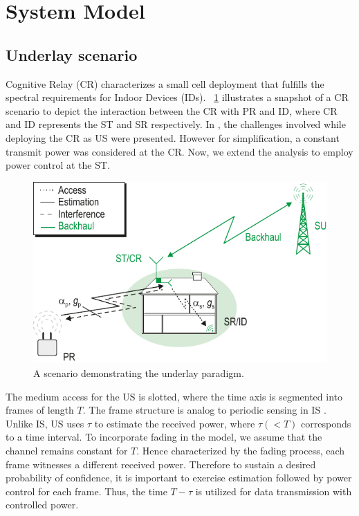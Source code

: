 \documentclass[conference, twocolumn]{IEEEtran}
\begin{document}
\section{System Model} \label{sec:sys_mod}

\subsection{Underlay scenario}
Cognitive Relay (CR) \cite{Kaushik14} characterizes a small cell deployment that fulfills the spectral requirements for Indoor Devices (IDs). \figurename~\ref{fig:scenario} illustrates a snapshot of a CR scenario to depict the interaction between the CR with PR and ID, where CR and ID represents the ST and SR respectively. In \cite{Kaushik14}, the challenges involved while deploying the CR as US were presented. However for simplification, a constant transmit power was considered at the CR. Now, we extend the analysis to employ power control at the ST. 
\begin{figure}[!t]
\centering
\includegraphics[width = 0.85 \columnwidth]{figures/CR_Scenario_Underlay}
\caption{A scenario demonstrating the underlay paradigm.}
\label{fig:scenario}
\vspace{-5mm}
\end{figure}

The medium access for the US is slotted, where the time axis is segmented into frames of length $T$. The frame structure is analog to periodic sensing in IS \cite{Liang08}. Unlike IS, US uses $\tau$ to estimate the received power, where $\tau (< T)$ corresponds to a time interval. To incorporate fading in the model, we assume that the channel remains constant for $T$. Hence characterized by the fading process, each frame witnesses a different received power. Therefore to sustain a desired probability of confidence, it is important to exercise estimation followed by power control for each frame. Thus, the time $T - \tau$ is utilized for data transmission with controlled power. 
\end{document}
